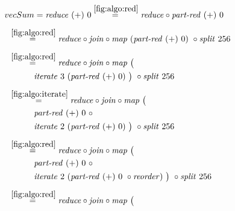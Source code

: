 \begin{figure*}[t]
\begin{align*}
  &\hspace{-1.5em}vecSum = \reduce\ (+)\ 0
%
  \overset{\ref{fig:algo:red}}{=\hspace{.2em}}
      \reduce \circ \partRed\ (+)\ 0\\[.5em]
%
  &\hspace{-2em}\quad\begin{aligned}
    &\overset{\ref{fig:algo:red}}{=\hspace{.2em}}
      \reduce \circ \join \circ \map\ (\partRed\ (+)\ 0)\ \circ \splitN\ 256
  \end{aligned}\\[.5em]
%
  &\hspace{-2em}\quad\begin{aligned}
    &\overset{\ref{fig:algo:red}}{=\hspace{.2em}}
      \reduce \circ \join \circ \map\ \big(\\
    &\qquad\quad\iterateN\ 3\ (\partRed\ (+)\ 0)\ \big)\ \circ \splitN\ 256
  \end{aligned}\\[.5em]
%
  &\hspace{-2em}\quad\begin{aligned}
    &\overset{\ref{fig:algo:iterate}}{=\hspace{.2em}}
      \reduce \circ \join \circ \map\ \big(\\
    &\qquad\quad\partRed\ (+)\ 0\ \circ\\
    &\qquad\quad\iterateN\ 2\ (\partRed\ (+)\ 0)\ \big)\ \circ \splitN\ 256
  \end{aligned}\\[.5em]
%
  &\hspace{-2em}\quad\begin{aligned}
    &\overset{\ref{fig:algo:red}}{=\hspace{.2em}}
      \reduce \circ \join \circ \map\ \big(\\
    &\qquad\quad\partRed\ (+)\ 0\ \circ\\
    &\qquad\quad\iterateN\ 2\ (\partRed\ (+)\ 0\ \circ \reorder)\ \big)\ \circ \splitN\ 256
  \end{aligned}\\[.5em]
%
  &\hspace{-2em}\quad\begin{aligned}
    &\overset{\ref{fig:algo:red}}{=\hspace{.2em}}
      \reduce \circ \join \circ \map\ \big(\\

\end{aligned}
\end{align*}
\end{figure*}
